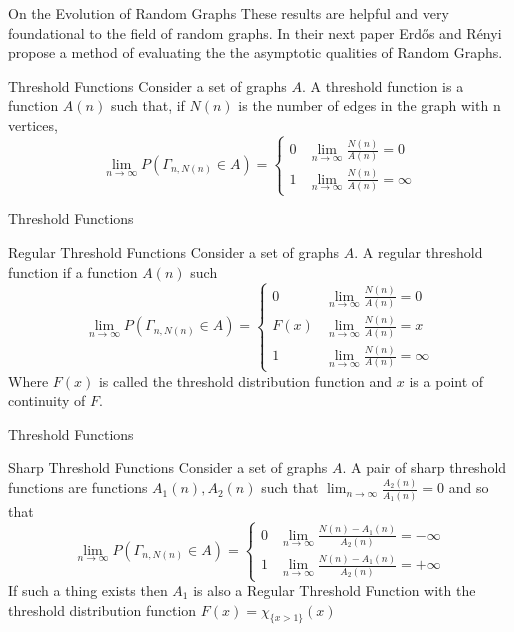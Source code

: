 \documentclass{beamer}
\begin{document}
\begin{frame}{On the Evolution of Random Graphs}
	These results are helpful and very foundational to the field of random graphs. In their next paper Erd\H{o}s and R\'enyi propose a method of evaluating the the asymptotic qualities of Random Graphs. 
	
	\begin{block}{Threshold Functions}
		Consider a set of graphs $A$. A threshold function is a function $A(n)$ such that, if $N(n)$ is the number of edges in the graph with n vertices,
		\begin{equation}
			\lim_{n\rightarrow \infty} P(\Gamma_{n,N(n)}\in A)=\begin{cases}
				0&\lim_{n\rightarrow \infty }\frac{N(n)}{A(n)}=0\\
				1&\lim_{n\rightarrow \infty }\frac{N(n)}{A(n)}=\infty 
			\end{cases}
		\end{equation} 
	\end{block}
\end{frame}

\begin{frame}{Threshold Functions}
	\begin{block}{Regular Threshold Functions}
		Consider a set of graphs $A$. A regular threshold function if a function $A(n)$ such 
		\begin{equation}
			\lim_{n\rightarrow \infty}P(\Gamma_{n,N(n)}\in A)=\begin{cases}
				0& \lim_{n\rightarrow \infty}\frac{N(n)}{A(n)} = 0\\
				F(x)&\lim_{n\rightarrow \infty}\frac{N(n)}{A(n)}=x\\
				1&\lim_{n\rightarrow \infty}\frac{N(n)}{A(n)}=\infty
			\end{cases}
		\end{equation}
		Where $F(x)$ is called the threshold distribution function and $x$ is a point of continuity of $F$. 
	\end{block}
\end{frame}

\begin{frame}{Threshold Functions}
	\begin{block}{Sharp Threshold Functions}
		Consider a set of graphs $A$. A pair of sharp threshold functions are functions $A_1(n),A_2(n)$ such that $\lim_{n\rightarrow \infty}\frac{A_2(n)}{A_1(n)}=0$ and so that
		\begin{equation}
			\lim_{n\rightarrow \infty}P(\Gamma_{n,N(n)}\in A)=\begin{cases}
				0 & \lim_{n\rightarrow \infty}\frac{N(n)-A_1(n)}{A_2(n)}=-\infty \\
				1 & \lim_{n\rightarrow \infty}\frac{N(n)-A_1(n)}{A_2(n)}=+\infty 
			\end{cases}
		\end{equation}
		If such a thing exists then $A_1$ is also a Regular Threshold Function with the threshold distribution function $F(x)=\chi_{\{x>1\}}(x)$
	\end{block}
\end{frame}
\end{document}
